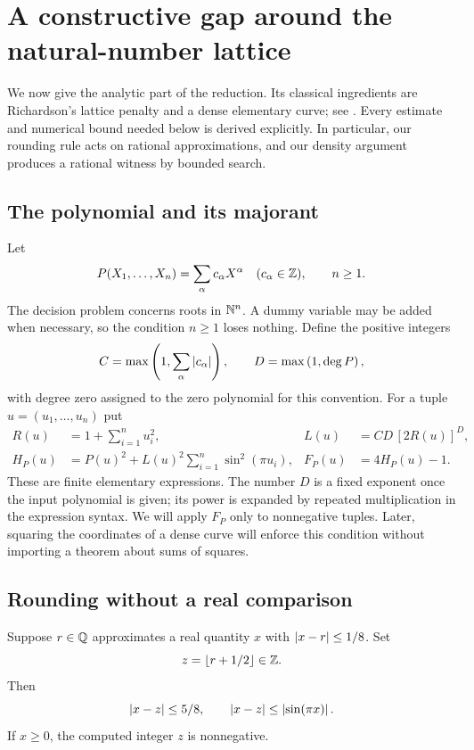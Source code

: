 \section{A constructive gap around the natural-number lattice}
\label{sec:gap}

We now give the analytic part of the reduction. Its classical ingredients are
Richardson's lattice penalty and a dense elementary curve; see
\cite{richardson,poonen}. Every estimate and numerical bound needed below is
derived explicitly. In particular, our rounding rule acts on rational
approximations, and our density argument produces a rational witness by bounded
search.

\subsection{The polynomial and its majorant}

Let
\[
 P(X_1,\ldots,X_n)=\sum_\alpha c_\alpha X^\alpha
 \quad(c_\alpha\in\mathbb Z),\qquad n\ge1.
\]
The decision problem concerns roots in $\mathbb N^n$. A dummy variable may be added
when necessary, so the condition $n\ge1$ loses nothing. Define the positive
integers
\[
 C=\max\left(1,\sum_\alpha\left|c_\alpha\right|\right),\qquad
 D=\max\left(1,\deg P\right),
\]
with degree zero assigned to the zero polynomial for this convention. For a
tuple $u=(u_1,\ldots,u_n)$ put
\begin{align}
 R(u)&=1+\sum_{i=1}^n u_i^2,
 &L(u)&=CD\,[2R(u)]^D,\label{eq:majorant}\\
 H_P(u)&=P(u)^2+L(u)^2\sum_{i=1}^n\sin^2(\pi u_i),
 &F_P(u)&=4H_P(u)-1.\label{eq:gap-function}
\end{align}
These are finite elementary expressions. The number $D$ is a fixed exponent
once the input polynomial is given; its power is expanded by repeated
multiplication in the expression syntax. We will apply $F_P$ only to
nonnegative tuples. Later, squaring the coordinates of a dense curve will
enforce this condition without importing a theorem about sums of squares.

\subsection{Rounding without a real comparison}

\begin{lemma}\label{lem:rounding}
Suppose $r\in\mathbb Q$ approximates a real quantity $x$ with
$\left|x-r\right|\le1/8$. Set
\[
 z=\lfloor r+1/2\rfloor\in\mathbb Z.
\]
Then
\[
 \left|x-z\right|\le5/8,
 \qquad
 \left|x-z\right|\le\left|\sin(\pi x)\right|.
\]
If $x\ge0$, the computed integer $z$ is nonnegative.
\end{lemma}

